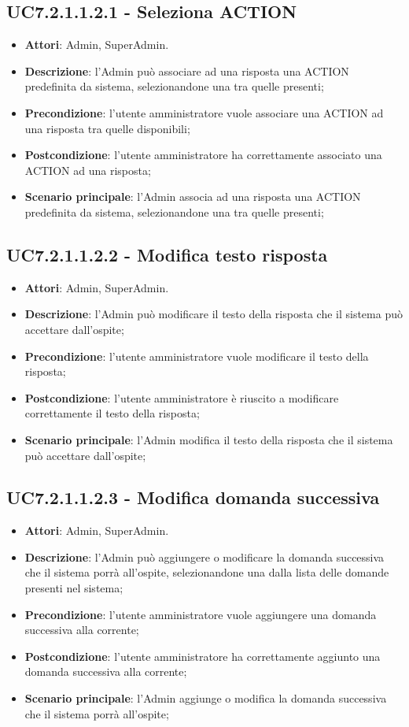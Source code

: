 \documentclass[../AnalisiDeiRequisiti_v4.0.0.tex]{subfiles}
\begin{document}
\begin{itemize}
\subsection{UC7.2.1.1.2.1 - Seleziona ACTION} 
\label{sssec:UC7.2.1.1.2.1} 
\begin{itemize} 
\item \textbf{Attori}: Admin, SuperAdmin.
\item \textbf{Descrizione}: l'Admin può associare ad una risposta una ACTION predefinita da sistema, selezionandone una tra quelle presenti;
\item \textbf{Precondizione}: l'utente amministratore vuole associare una ACTION ad una risposta tra quelle disponibili;
\item \textbf{Postcondizione}: l'utente amministratore ha correttamente associato una ACTION ad una risposta;\item \textbf{Scenario principale}: l'Admin associa ad una risposta una ACTION predefinita da sistema, selezionandone una tra quelle presenti;
\end{itemize}
\subsection{UC7.2.1.1.2.2 - Modifica testo risposta} 
\label{sssec:UC7.2.1.1.2.2} 
\begin{itemize} 
\item \textbf{Attori}: Admin, SuperAdmin.
\item \textbf{Descrizione}: l'Admin può modificare il testo della risposta che il sistema può accettare dall'ospite;
\item \textbf{Precondizione}: l'utente amministratore vuole modificare il testo della risposta;
\item \textbf{Postcondizione}: l'utente amministratore è riuscito a modificare correttamente il testo della risposta;
\item \textbf{Scenario principale}: l'Admin modifica il testo della risposta che il sistema può accettare dall'ospite;
\end{itemize} 
\subsection{UC7.2.1.1.2.3 - Modifica domanda successiva} 
\label{sssec:UC7.2.1.1.2.3} 
\begin{itemize} 
\item \textbf{Attori}: Admin, SuperAdmin.
\item \textbf{Descrizione}: l'Admin può aggiungere o modificare la domanda successiva che il sistema porrà all'ospite, selezionandone una dalla lista delle domande presenti nel sistema;
\item \textbf{Precondizione}: l'utente amministratore vuole aggiungere una domanda successiva alla corrente;
\item \textbf{Postcondizione}: l'utente amministratore ha correttamente aggiunto una domanda successiva alla corrente;
\item \textbf{Scenario principale}: l'Admin aggiunge o modifica la domanda successiva che il sistema porrà all'ospite;
\end{itemize} 

\end{itemize}
\end{document}
